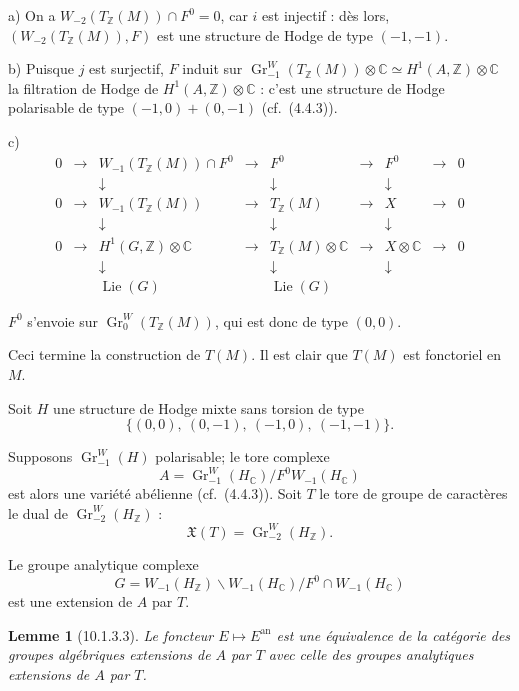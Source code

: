 \documentclass[12pt,a4paper]{amsart}
\theoremstyle{plain}
\newtheorem{lemme}{Lemme}[section]
\theoremstyle{definition}
\theoremstyle{remark}
\DeclareMathOperator{\Lie}{Lie}
\DeclareMathOperator{\Gr}{Gr}
\numberwithin{equation}{section}
\begin{document}
\setcounter{section}{9}
\setcounter{lemme}{2}

a) On a $W_{-2}(T_\mathbb{Z}(M))\cap F^0=0$, car $i$ est injectif : dès lors, $(W_{-2}(T_\mathbb{Z}(M)),F)$
est une structure de Hodge de type $(-1,-1)$.

b) Puisque $j$ est surjectif, $F$ induit sur $\Gr_{-1}^W(T_\mathbb{Z}(M))\otimes\mathbb{C}\simeq H^1(A,\mathbb{Z})\otimes\mathbb{C}$ la filtration de Hodge de $H^1(A,\mathbb{Z})\otimes\mathbb{C}$ : c'est une structure de Hodge polarisable de type $(-1,0)+(0,-1)$ (cf.~(4.4.3)).

c)
\[
\begin{array}{ccccccccc}
0 & \longrightarrow & W_{-1}(T_\mathbb{Z}(M))\cap F^0 & \longrightarrow & F^0 & \longrightarrow & F^0 & \longrightarrow & 0 \\
 & & \downarrow & & \downarrow & & \downarrow & & \\
0 & \longrightarrow & W_{-1}(T_\mathbb{Z}(M)) & \longrightarrow & T_\mathbb{Z}(M) & \longrightarrow & X & \longrightarrow & 0 \\
 & & \downarrow & & \downarrow & & \downarrow & & \\
0 & \longrightarrow & H^1(G,\mathbb{Z})\otimes\mathbb{C} & \longrightarrow & T_\mathbb{Z}(M)\otimes\mathbb{C} & \longrightarrow & X\otimes\mathbb{C} & \longrightarrow & 0 \\
 & & \downarrow & & \downarrow & & \downarrow & & \\
 & & \Lie(G) & & \Lie(G) & & & &
\end{array}
\]

$F^0$ s'envoie sur $\Gr_0^W(T_\mathbb{Z}(M))$, qui est donc de type $(0,0)$.

Ceci termine la construction de $T(M)$. Il est clair que $T(M)$ est fonctoriel en $M$.

Soit $H$ une structure de Hodge mixte sans torsion de type
\[
\{(0,0),\ (0,-1),\ (-1,0),\ (-1,-1)\}.
\]

Supposons $\Gr_{-1}^W(H)$ polarisable; le tore complexe
\[
A = \Gr_{-1}^W(H_\mathbb{C})/F^0W_{-1}(H_\mathbb{C})
\]
est alors une variété abélienne (cf.~(4.4.3)). Soit $T$ le tore de groupe de caractères le dual de $\Gr_{-2}^W(H_\mathbb{Z})$ :
\[
\mathfrak{X}(T) = \Gr_{-2}^W(H_\mathbb{Z}).
\]

Le groupe analytique complexe
\[
G = W_{-1}(H_\mathbb{Z})\backslash W_{-1}(H_\mathbb{C})/F^0\cap W_{-1}(H_\mathbb{C})
\]
est une extension de $A$ par $T$.

\begin{lemme}[10.1.3.3]\label{lemme:10.1.3.3}
Le foncteur $E\mapsto E^\mathrm{an}$ est une équivalence de la catégorie des groupes algébriques extensions de $A$ par $T$ avec celle des groupes analytiques extensions de $A$ par $T$.
\end{lemme}
\end{document}

